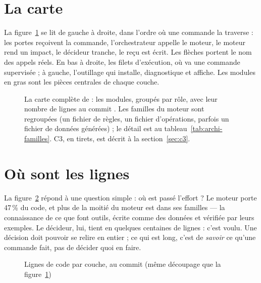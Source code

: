 \section{La carte}
La figure~\ref{fig:carte} se lit de gauche à droite, dans l'ordre où une commande la traverse :
les portes reçoivent la commande, l'orchestrateur appelle le moteur, le moteur rend un impact, le
décideur tranche, le reçu est écrit. Les flèches portent le nom des appels réels. En bas à
droite, les filets d'exécution, où va une commande supervisée ; à gauche, l'outillage qui
installe, diagnostique et affiche. Les modules en gras sont les pièces centrales de chaque couche.

\begin{figure}
\centering
\resizebox{\textheight}{!}{}
\caption[La carte complète de \demo{} : les \nbmodules{} modules, groupés par rôle]{La carte complète de \demo{} : les \nbmodules{} modules, groupés par rôle, avec leur
nombre de lignes au commit \commitref{}. Les familles du moteur sont regroupées (un fichier de
règles, un fichier d'opérations, parfois un fichier de données générées) ; le détail est au
tableau~\ref{tab:archi-familles}. C3, en tirets, est décrit à la section~\ref{sec:c3}.}
\label{fig:carte}
\end{figure}

\section{Où sont les lignes}
La figure~\ref{fig:couches} répond à une question simple : où est passé l'effort ? Le moteur porte
47\,\% du code, et plus de la moitié du moteur est dans ses familles ---
la connaissance de ce que font \nboutils{} outils, écrite comme des données et vérifiée par
leurs exemples. Le décideur, lui, tient en quelques centaines de lignes : c'est voulu. Une
décision doit pouvoir se relire en entier ; ce qui est long, c'est de \emph{savoir} ce qu'une
commande fait, pas de décider quoi en faire.

\begin{figure}[htbp]
\centering

\caption{Lignes de code par couche, au commit \commitref{} (même découpage que la
figure~\ref{fig:carte})}
\label{fig:couches}
\end{figure}

